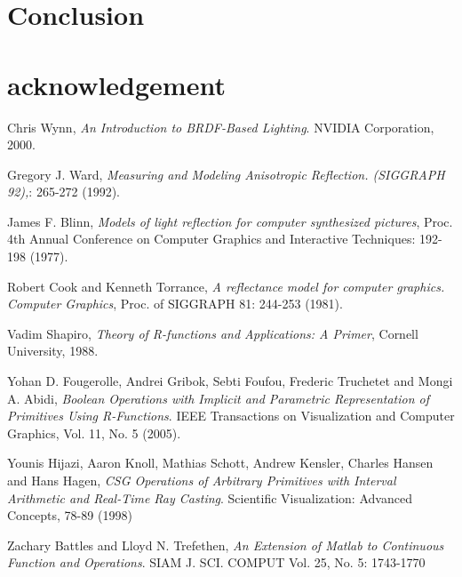 \documentclass[11pt]{amsart}
\theoremstyle{definition}
\begin{document}
\section{Conclusion}
\section{acknowledgement}

\begin{thebibliography}{9}
Chris Wynn,
\emph{An Introduction to BRDF-Based Lighting}.
NVIDIA Corporation, 2000.

Gregory J. Ward, 
\emph{Measuring and Modeling Anisotropic Reflection. (SIGGRAPH 92),}: 265-272 (1992).

James F. Blinn,  
\emph{Models of light reflection for computer synthesized pictures}, Proc. 4th
Annual Conference on Computer Graphics and Interactive Techniques: 192-198
(1977). 

Robert Cook and Kenneth Torrance,
\emph{A reflectance model for computer graphics. Computer Graphics}, Proc. of SIGGRAPH 81: 244-253 (1981).  

Vadim Shapiro,
\emph{Theory of R-functions and Applications: A Primer}, Cornell University, 1988.

Yohan D. Fougerolle, Andrei Gribok, Sebti Foufou, Frederic Truchetet and Mongi A. Abidi,
\emph{Boolean Operations with Implicit and Parametric Representation of Primitives Using R-Functions}.
IEEE Transactions on Visualization and Computer Graphics, Vol. 11, No. 5 (2005).

Younis Hijazi, Aaron Knoll, Mathias Schott, Andrew Kensler, Charles Hansen and Hans Hagen,
\emph{CSG Operations of Arbitrary Primitives with Interval Arithmetic and Real-Time Ray Casting}.
Scientific Visualization: Advanced Concepts, 78-89 (1998) 
	
 
  Zachary Battles and Lloyd N. Trefethen,
  \emph{An Extension of Matlab to Continuous Function and Operations}.
  SIAM J. SCI. COMPUT Vol. 25, No. 5: 1743-1770 
 



	



\end{thebibliography}


%
\end{document}
